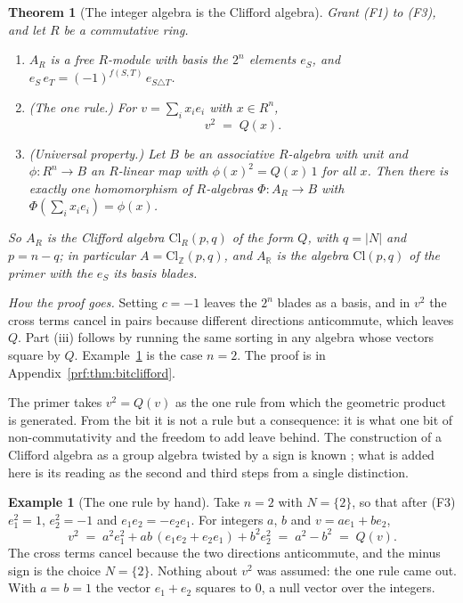 \documentclass[11pt]{article}
\theoremstyle{plain}
\newtheorem{theorem}{Theorem}[section]
\theoremstyle{definition}
\newtheorem{example}{Example}
\theoremstyle{plain}
\theoremstyle{definition}
\newcommand{\Cl}{\mathrm{Cl}}
\newcommand{\R}{\mathbb{R}}
\newcommand{\Z}{\mathbb{Z}}
\begin{document}
\begin{theorem}[The integer algebra is the Clifford algebra]\label{thm:bitclifford}
Grant \textup{(F1)} to \textup{(F3)}, and let $R$ be a commutative ring.
\begin{enumerate}
\item[(i)] $A_{R}$ is a free $R$-module with basis the $2^{n}$ elements $e_{S}$, and
$e_{S}\,e_{T} = (-1)^{f(S,T)}\,e_{S \triangle T}$.
\item[(ii)] \textup{(The one rule.)} For $v = \sum_{i} x_{i}e_{i}$ with $x \in R^{n}$,
\[
v^{2} \;=\; Q(x) .
\]
\item[(iii)] \textup{(Universal property.)} Let $B$ be an associative $R$-algebra with unit and $\phi : R^{n} \to B$ an $R$-linear map with $\phi(x)^{2} = Q(x)\,1$ for all $x$. Then there is exactly one homomorphism of $R$-algebras $\Phi : A_{R} \to B$ with $\Phi(\sum_{i} x_{i}e_{i}) = \phi(x)$.
\end{enumerate}
So $A_{R}$ is the Clifford algebra $\Cl_{R}(p,q)$ of the form $Q$, with $q = |N|$ and $p = n - q$; in particular $A = \Cl_{\Z}(p,q)$, and $A_{\R}$ is the algebra $\Cl(p,q)$ of the primer \cite[Sections 2 to 4]{ButlerT0} with the $e_{S}$ its basis blades.
\end{theorem}

\noindent\emph{How the proof goes.} Setting $c = -1$ leaves the $2^{n}$ blades as a basis, and in $v^{2}$ the cross terms cancel in pairs because different directions anticommute, which leaves $Q$. Part (iii) follows by running the same sorting in any algebra whose vectors square by $Q$. Example~\ref{ex:onerule} is the case $n = 2$. The proof is in Appendix~\ref{prf:thm:bitclifford}.

The primer \cite[Section 2]{ButlerT0} takes $v^{2} = Q(v)$ as the one rule from which the geometric product is generated. From the bit it is not a rule but a consequence: it is what one bit of non-commutativity and the freedom to add leave behind. The construction of a Clifford algebra as a group algebra twisted by a sign is known \cite{AlbuquerqueMajid2002}; what is added here is its reading as the second and third steps from a single distinction.

\begin{example}[The one rule by hand]\label{ex:onerule}
Take $n = 2$ with $N = \{2\}$, so that after (F3) $e_{1}^{2} = 1$, $e_{2}^{2} = -1$ and $e_{1}e_{2} = -e_{2}e_{1}$. For integers $a$, $b$ and $v = a e_{1} + b e_{2}$,
\[
v^{2} \;=\; a^{2}e_{1}^{2} + ab\,(e_{1}e_{2} + e_{2}e_{1}) + b^{2}e_{2}^{2} \;=\; a^{2} - b^{2} \;=\; Q(v) .
\]
The cross terms cancel because the two directions anticommute, and the minus sign is the choice $N = \{2\}$. Nothing about $v^{2}$ was assumed: the one rule came out. With $a = b = 1$ the vector $e_{1} + e_{2}$ squares to $0$, a null vector over the integers.
\end{example}
\end{document}

